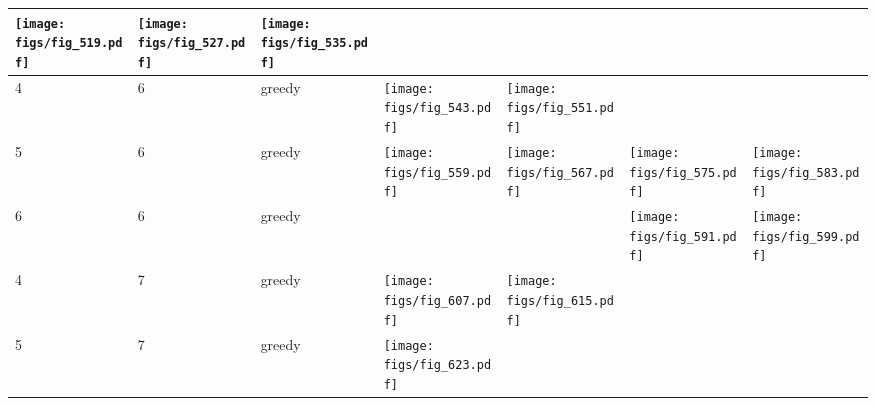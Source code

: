 \documentclass[oneside,canadian,landscape]{article}
\begin{document}
\begin{center}
\begin{longtable}{|l|l|l||l|l|l|l|}
\begin{minipage}{3.5cm}
\texttt{[image: figs/fig\_519.pdf]}
\end{minipage}
&\begin{minipage}{3.5cm}
\texttt{[image: figs/fig\_527.pdf]}
\end{minipage}
&\begin{minipage}{3.5cm}
\texttt{[image: figs/fig\_535.pdf]}
\end{minipage}
\\ \hline
4&6&greedy&\begin{minipage}{3.5cm}
\texttt{[image: figs/fig\_543.pdf]}
\end{minipage}
&\begin{minipage}{3.5cm}
\texttt{[image: figs/fig\_551.pdf]}
\end{minipage}
&&\\ \hline
5&6&greedy&\begin{minipage}{3.5cm}
\texttt{[image: figs/fig\_559.pdf]}
\end{minipage}
&\begin{minipage}{3.5cm}
\texttt{[image: figs/fig\_567.pdf]}
\end{minipage}
&\begin{minipage}{3.5cm}
\texttt{[image: figs/fig\_575.pdf]}
\end{minipage}
&\begin{minipage}{3.5cm}
\texttt{[image: figs/fig\_583.pdf]}
\end{minipage}
\\ \hline
6&6&greedy&&&\begin{minipage}{3.5cm}
\texttt{[image: figs/fig\_591.pdf]}
\end{minipage}
&\begin{minipage}{3.5cm}
\texttt{[image: figs/fig\_599.pdf]}
\end{minipage}
\\ \hline
4&7&greedy&\begin{minipage}{3.5cm}
\texttt{[image: figs/fig\_607.pdf]}
\end{minipage}
&\begin{minipage}{3.5cm}
\texttt{[image: figs/fig\_615.pdf]}
\end{minipage}
&&\\ \hline
5&7&greedy&\begin{minipage}{3.5cm}
\texttt{[image: figs/fig\_623.pdf]}
\end{minipage}
&\begin{minipage}{3.5cm}

\end{minipage}
\end{longtable}
\end{center}
\end{document}
